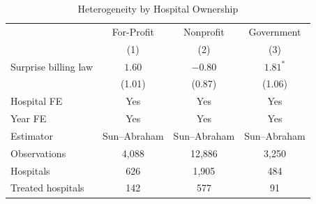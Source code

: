 \begin{table}[htbp]
\centering
\caption{Heterogeneity by Hospital Ownership}
\label{tab:ownership}
\begin{tabular}{lccc}
\hline\hline
 & For-Profit & Nonprofit & Government \\
 & (1) & (2) & (3) \\
\hline
Surprise billing law & $1.60$ & $-0.80$ & $1.81^{*}$ \\
 & (1.01) & (0.87) & (1.06) \\
\hline
Hospital FE & Yes & Yes & Yes \\
Year FE & Yes & Yes & Yes \\
Estimator & Sun--Abraham & Sun--Abraham & Sun--Abraham \\
Observations & 4,088 & 12,886 & 3,250 \\
Hospitals & 626 & 1,905 & 484 \\
Treated hospitals & 142 & 577 & 91 \\
\hline\hline
\end{tabular}
\par{}
\end{table}
